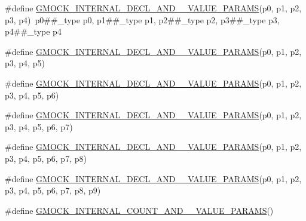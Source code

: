 \begin{DoxyCompactItemize}
\#define \mbox{\hyperlink{_obj__test_2lib_2googletest-release-1_88_81_2googlemock_2include_2gmock_2gmock-generated-actions_8h_a0fd289b917553899d908b0f406f8f75d}{G\+M\+O\+C\+K\+\_\+\+I\+N\+T\+E\+R\+N\+A\+L\+\_\+\+D\+E\+C\+L\+\_\+\+A\+N\+D\+\_\+\_\+\+V\+A\+L\+U\+E\+\_\+\+P\+A\+R\+A\+MS}}(p0,  p1,  p2,  p3,  p4)~p0\#\#\+\_\+type p0, p1\#\#\+\_\+type p1, p2\#\#\+\_\+type p2, p3\#\#\+\_\+type p3, p4\#\#\+\_\+type p4
\item 
\#define \mbox{\hyperlink{_obj__test_2lib_2googletest-release-1_88_81_2googlemock_2include_2gmock_2gmock-generated-actions_8h_a80b3221bf467d72d15120045c9f52a6e}{G\+M\+O\+C\+K\+\_\+\+I\+N\+T\+E\+R\+N\+A\+L\+\_\+\+D\+E\+C\+L\+\_\+\+A\+N\+D\+\_\+\_\+\+V\+A\+L\+U\+E\+\_\+\+P\+A\+R\+A\+MS}}(p0,  p1,  p2,  p3,  p4,  p5)
\item 
\#define \mbox{\hyperlink{_obj__test_2lib_2googletest-release-1_88_81_2googlemock_2include_2gmock_2gmock-generated-actions_8h_af762ce6b60357100fd2c8176ef2f4102}{G\+M\+O\+C\+K\+\_\+\+I\+N\+T\+E\+R\+N\+A\+L\+\_\+\+D\+E\+C\+L\+\_\+\+A\+N\+D\+\_\+\_\+\+V\+A\+L\+U\+E\+\_\+\+P\+A\+R\+A\+MS}}(p0,  p1,  p2,  p3,  p4,  p5,  p6)
\item 
\#define \mbox{\hyperlink{_obj__test_2lib_2googletest-release-1_88_81_2googlemock_2include_2gmock_2gmock-generated-actions_8h_a3ce778c4907edf2818c948a78a94760a}{G\+M\+O\+C\+K\+\_\+\+I\+N\+T\+E\+R\+N\+A\+L\+\_\+\+D\+E\+C\+L\+\_\+\+A\+N\+D\+\_\+\_\+\+V\+A\+L\+U\+E\+\_\+\+P\+A\+R\+A\+MS}}(p0,  p1,  p2,  p3,  p4,  p5,  p6,  p7)
\item 
\#define \mbox{\hyperlink{_obj__test_2lib_2googletest-release-1_88_81_2googlemock_2include_2gmock_2gmock-generated-actions_8h_a94ebf056f6c78d158bf16eec04583dd0}{G\+M\+O\+C\+K\+\_\+\+I\+N\+T\+E\+R\+N\+A\+L\+\_\+\+D\+E\+C\+L\+\_\+\+A\+N\+D\+\_\+\_\+\+V\+A\+L\+U\+E\+\_\+\+P\+A\+R\+A\+MS}}(p0,  p1,  p2,  p3,  p4,  p5,  p6,  p7,  p8)
\item 
\#define \mbox{\hyperlink{_obj__test_2lib_2googletest-release-1_88_81_2googlemock_2include_2gmock_2gmock-generated-actions_8h_a125c9b0d293f0e900ff37ce42b8ed217}{G\+M\+O\+C\+K\+\_\+\+I\+N\+T\+E\+R\+N\+A\+L\+\_\+\+D\+E\+C\+L\+\_\+\+A\+N\+D\+\_\+\_\+\+V\+A\+L\+U\+E\+\_\+\+P\+A\+R\+A\+MS}}(p0,  p1,  p2,  p3,  p4,  p5,  p6,  p7,  p8,  p9)
\item 
\#define \mbox{\hyperlink{_obj__test_2lib_2googletest-release-1_88_81_2googlemock_2include_2gmock_2gmock-generated-actions_8h_a4876365f0389f3cd8021f650d095be55}{G\+M\+O\+C\+K\+\_\+\+I\+N\+T\+E\+R\+N\+A\+L\+\_\+\+C\+O\+U\+N\+T\+\_\+\+A\+N\+D\+\_\+\_\+\+V\+A\+L\+U\+E\+\_\+\+P\+A\+R\+A\+MS}}()

\end{DoxyCompactItemize}
